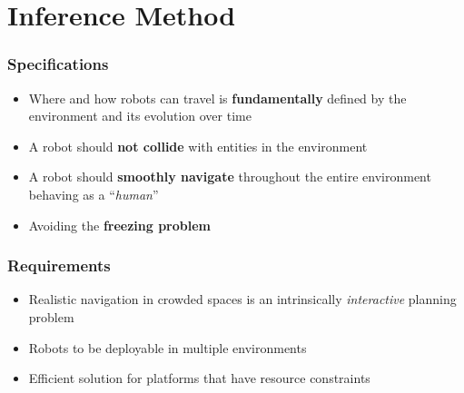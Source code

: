 \section{Inference Method}

\begin{frame}
	\frametitle{Specifications}
	
	\Large
	
	\begin{itemize}
		\item Where and how robots can travel is \textbf{fundamentally} defined by the
			  environment and its evolution over time
		\vspace{-0.5cm}
		\item A robot should \textbf{not collide} with entities in the environment
		\vspace{0.1cm}
		\item A robot should \textbf{smoothly navigate} throughout the entire environment
			  behaving as a ``\emph{human}''
		\vspace{0.1cm}
		\item Avoiding the \textbf{freezing problem}
	\end{itemize}
\end{frame}

\begin{frame}
	\frametitle{Requirements}
	
	\Large
	
	\begin{itemize}
		\item Realistic navigation in crowded spaces is an intrinsically
			  \emph{interactive} planning problem
		\vspace{0.1cm}
		\item Robots to be deployable in multiple environments
		\vspace{0.1cm}
		\item Efficient solution for platforms that have resource constraints
	\end{itemize}
\end{frame}

